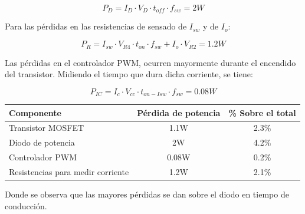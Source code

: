 \documentclass[e4_tp2_main.tex]{subfiles}
\begin{document}
\[
P_D = I_D \cdot V_D \cdot t_{off} \cdot f_{sw} = 2W
\]

Para las pérdidas en las resistencias de sensado de $I_{sw}$ y de $I_o$:

\[
P_{R} = I_{sw} \cdot V_{R4} \cdot t_{on} \cdot f_{sw} + I_o \cdot V_{R2} = 1.2W  
\]

Las pérdidas en el controlador PWM, ocurren mayormente durante el encendido del transistor. Midiendo el tiempo que dura dicha corriente, se tiene:

\[
P_{IC} = I_c \cdot V_{cc} \cdot t_{on-Isw} \cdot f_{sw} = 0.08W
\]

\begin{table}[h]
\centering
\begin{tabular}{|l|c|c|}
\hline
Componente                        & \multicolumn{1}{l|}{Pérdida de potencia} & \multicolumn{1}{l|}{\% Sobre el total} \\ \hline
Transistor MOSFET                 & 1.1W                                     & 2.3\%                                  \\ \hline
Diodo de potencia                 & 2W                                       & 4.2\%                                  \\ \hline
Controlador PWM                   & 0.08W                                    & 0.2\%                                  \\ \hline
Resistencias para medir corriente & 1.2W                                       & 2.1\%                                  \\ \hline
\end{tabular}
\end{table}

Donde se observa que las mayores pérdidas se dan sobre el diodo en tiempo de conducción.
\end{document}

